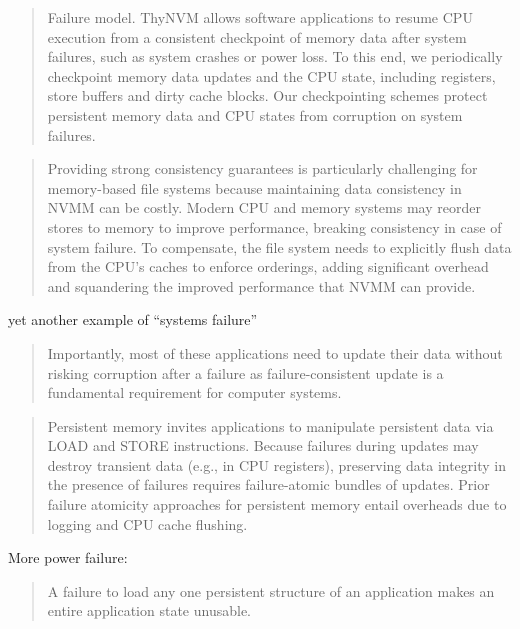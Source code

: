 \begin{quotation}
    Failure model. ThyNVM allows software applications to
resume CPU execution from a consistent checkpoint of
memory data after system failures, such as system crashes
or power loss. To this end, we periodically checkpoint memory
data updates and the CPU state, including registers, store
buffers and dirty cache blocks. Our checkpointing schemes
protect persistent memory data and CPU states from corruption
on system failures.
\cite{ren2015thynvm}
\end{quotation}

\begin{quotation}
    Providing strong consistency guarantees is particularly
challenging for memory-based file systems because maintaining
data consistency in NVMM can be costly. Modern
CPU and memory systems may reorder stores to memory to
improve performance, breaking consistency in case of system
failure. To compensate, the file system needs to explicitly
flush data from the CPU’s caches to enforce orderings, adding
significant overhead and squandering the improved performance
that NVMM can provide.\cite{xu2016nova}
\end{quotation}

yet another example of ``systems failure''\cite{lu2017improving}

\begin{quotation}
    Importantly, most of these applications
need to update their data without risking corruption
after a failure as failure-consistent update is a fundamental
requirement for computer systems.\cite{ou2016fast}
\end{quotation}

\begin{quotation}
    Persistent memory invites applications to manipulate persistent
data via LOAD and STORE instructions. Because failures
during updates may destroy transient data (e.g., in CPU
registers), preserving data integrity in the presence of failures
requires failure-atomic bundles of updates. Prior failure
atomicity approaches for persistent memory entail overheads
due to logging and CPU cache flushing.
    \cite{izraelevitz2016failure}
\end{quotation}

More power failure: \cite{Maeng:2017:AIE:3152284.3133920}

\begin{quotation}
    A failure to load any one persistent
structure of an application makes an entire application
state unusable.\cite{kannan2016pvm}
\end{quotation}

